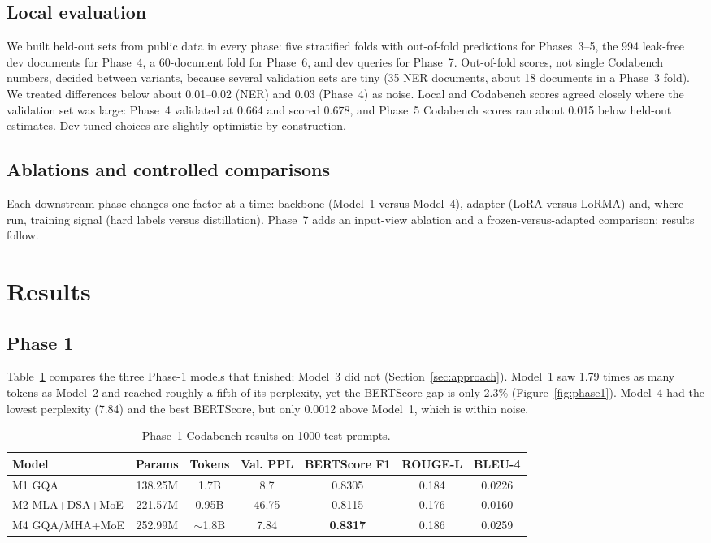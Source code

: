 \documentclass[11pt, oneside]{article}
\begin{document}
\subsection{Local evaluation}
We built held-out sets from public data in every phase: five stratified folds with out-of-fold predictions for Phases~3--5, the 994 leak-free dev documents for Phase~4, a 60-document fold for Phase~6, and dev queries for Phase~7. Out-of-fold scores, not single Codabench numbers, decided between variants, because several validation sets are tiny (35 NER documents, about 18 documents in a Phase~3 fold). We treated differences below about 0.01--0.02 (NER) and 0.03 (Phase~4) as noise. Local and Codabench scores agreed closely where the validation set was large: Phase~4 validated at 0.664 and scored 0.678, and Phase~5 Codabench scores ran about 0.015 below held-out estimates. Dev-tuned choices are slightly optimistic by construction.

\subsection{Ablations and controlled comparisons}
Each downstream phase changes one factor at a time: backbone (Model~1 versus Model~4), adapter (LoRA versus LoRMA) and, where run, training signal (hard labels versus distillation). Phase~7 adds an input-view ablation and a frozen-versus-adapted comparison; results follow.

\section{Results}
\subsection{Phase 1}
Table~\ref{tab:phase1} compares the three Phase-1 models that finished; Model~3 did not (Section~\ref{sec:approach}). Model~1 saw 1.79 times as many tokens as Model~2 and reached roughly a fifth of its perplexity, yet the BERTScore gap is only 2.3\% (Figure~\ref{fig:phase1}). Model~4 had the lowest perplexity (7.84) and the best BERTScore, but only 0.0012 above Model~1, which is within noise.
\begin{table}[H]
\centering
\caption{Phase~1 Codabench results on 1000 test prompts.}
\label{tab:phase1}
\small
\begin{tabular}{lcccccc}
\toprule
Model & Params & Tokens & Val. PPL & BERTScore F1 & ROUGE-L & BLEU-4 \\
\midrule
M1 GQA & 138.25M & 1.7B & 8.7 & 0.8305 & 0.184 & 0.0226 \\
M2 MLA+DSA+MoE & 221.57M & 0.95B & 46.75 & 0.8115 & 0.176 & 0.0160 \\
M4 GQA/MHA+MoE & 252.99M & $\sim$1.8B & 7.84 & \textbf{0.8317} & 0.186 & 0.0259 \\
\bottomrule
\end{tabular}
\end{table}
\end{document}
